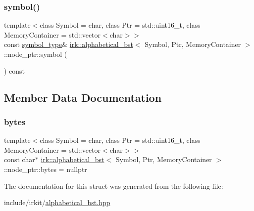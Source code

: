 \subsubsection{\texorpdfstring{symbol()}{symbol()}}
{\footnotesize\ttfamily template$<$class Symbol = char, class Ptr = std\+::uint16\+\_\+t, class Memory\+Container = std\+::vector$<$char$>$$>$ \\
const \mbox{\hyperlink{classirk_1_1alphabetical__bst_a296ccb8fa9fa9dce3b3c3beab0a5ca28}{symbol\+\_\+type}}\& \mbox{\hyperlink{classirk_1_1alphabetical__bst}{irk\+::alphabetical\+\_\+bst}}$<$ Symbol, Ptr, Memory\+Container $>$\+::node\+\_\+ptr\+::symbol (\begin{DoxyParamCaption}{ }\end{DoxyParamCaption}) const\hspace{0.3cm}{\ttfamily [inline]}}



\subsection{Member Data Documentation}
\mbox{\label{structirk_1_1alphabetical__bst_1_1node__ptr_afc089ea68fd618ec88d8acb2556d49e8}} 
\subsubsection{\texorpdfstring{bytes}{bytes}}
{\footnotesize\ttfamily template$<$class Symbol = char, class Ptr = std\+::uint16\+\_\+t, class Memory\+Container = std\+::vector$<$char$>$$>$ \\
const char$\ast$ \mbox{\hyperlink{classirk_1_1alphabetical__bst}{irk\+::alphabetical\+\_\+bst}}$<$ Symbol, Ptr, Memory\+Container $>$\+::node\+\_\+ptr\+::bytes = nullptr}



The documentation for this struct was generated from the following file\+:\begin{DoxyCompactItemize}
\item 
include/irkit/\mbox{\hyperlink{alphabetical__bst_8hpp}{alphabetical\+\_\+bst.\+hpp}}\end{DoxyCompactItemize}

